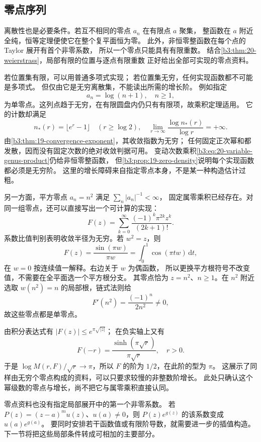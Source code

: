 \subsection{零点序列}
\label{b3:subsec:200303}

离散性也是必要条件。若互不相同的零点 \(a_n\) 在有限点 \(a\) 聚集，
整函数在 \(a\) 附近全纯，恒等定理便使它在整个复平面恒为零。
此外，非恒零整函数在每个点的 Taylor 展开有首个非零系数，
所以一个零点只能具有有限重数。
结合\cref{b3:thm:20-weierstrass}，局部有限的位置与逐点有限重数
正好给出全部可实现的零点资料。

\ProseParagraphBreak
若位置集有限，可以用普通多项式实现；
若位置集无穷，任何实现函数都不可能是多项式。
但仅由它是无穷离散集，不能读出所需的增长阶。
例如指定
\[
 a_n=\log(n+1),\quad n\ge1,
\]
为单零点。这列点趋于无穷，在有限圆盘内仍只有有限项，故乘积定理适用。
它的计数却满足
\[
 n_*(r)=\lfloor e^r-1\rfloor\quad(r\ge\log2),\quad
 \lim_{r\to\infty}\frac{\log n_*(r)}{\log r}=+\infty.
\]
由\cref{b3:thm:19-convergence-exponent}，其收敛指数为无穷；
任何固定正次幂和都发散，因而没有固定次数的绝对收敛判据可用。
变动次数乘积\eqref{b3:eq:20-variable-genus-product}仍给非恒零整函数，
但\cref{b3:prop:19-zero-density}说明每个实现函数都必须是无穷阶。
这里的增长障碍来自指定零点本身，不是某一种构造估计过粗。

\ProseParagraphBreak
另一方面，平方零点 \(a_n=n^2\) 满足 \(\sum_n|a_n|^{-1}<\infty\)，
固定属零乘积已经存在。对同一组零点，还可以直接写出一个可计算的实现：
\[
 F(z)=\sum_{k=0}^\infty\frac{(-1)^k\pi^{2k}z^k}{(2k+1)!}.
\]
系数比值判别表明收敛半径为无穷。若 \(w^2=z\)，则
\[
 F(z)=\frac{\sin(\pi w)}{\pi w}
     =\int_0^1\cos(\pi tw)\,\mathrm dt,
\]
在 \(w=0\) 按连续值一解释。右边关于 \(w\) 为偶函数，
所以更换平方根符号不改变值，不需要在全平面选一个平方根分支。
其零点恰为 \(z=n^2\)、\(n\ge1\)。在 \(n^2\) 附近选取
\(w(n^2)=n\) 的局部根，链式法则给
\[
 F'(n^2)=\frac{(-1)^n}{2n^2}\ne0,
\]
故这些零点都是单零点。

\ProseParagraphBreak
由积分表达式有 \(|F(z)|\le e^{\pi\sqrt{|z|}}\)；
在负实轴上又有
\[
 F(-r)=\frac{\sinh(\pi\sqrt r)}{\pi\sqrt r},\quad r>0.
\]
于是 \(\log M(r,F)/\sqrt r\to\pi\)，所以 \(F\) 的阶为
\(1/2\)，在此阶的型为 \(\pi\)。
这展示了同样由无穷个零点构成的资料，可以只要求较慢的非整数阶增长。
此处只确认这个幂级数的零点与增长，尚不把它与属零乘积直接认同。

\ProseParagraphBreak
零点资料也没有指定局部展开中的第一个非零系数。
若 \(P(z)=(z-a)^m u(z)\)、\(u(a)\ne0\)，则
\(P(z)e^{g(z)}\) 的该系数变成 \(u(a)e^{g(a)}\)。
要同时安排若干函数值或有限阶导数，就需要进一步的插值构造。
下一节将把这些局部条件转成可相加的主要部分。
